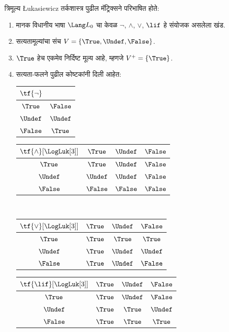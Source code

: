 \begin{defn}\label{mvl:thr:luk:def:lukasiewicz}
त्रिमूल्य \L ukasiewicz तर्कशास्त्र पुढील मॅट्रिक्सने परिभाषित होते:
\begin{enumerate}
  \item मानक विधानीय भाषा $\Lang L_0$ चा केवळ
  $\lnot$, $\land$, $\lor$, $\lif$ हे संयोजक असलेला खंड.
  \item सत्यतामूल्यांचा संच $V = \{\True, \Undef, \False\}$.
  \item $\True$ हेच एकमेव निर्दिष्ट मूल्य आहे, म्हणजे $V^+ = \{\True\}$.
  \item सत्यता-फलने पुढील कोष्टकांनी दिली आहेत:
  \begin{center}
    \begin{tabular}{c|c}
      $\tf{\lnot}$ & \\
      \hline
      $\True$ & $\False$ \\
      $\Undef$ & $\Undef$ \\
      $\False$ & $\True$
    \end{tabular}
    \quad
    \begin{tabular}{c|ccc}
      $\tf{\land}[\LogLuk[3]]$ & $\True$ & $\Undef$ & $\False$ \\
      \hline
      $\True$ & $\True$ & $\Undef$ & $\False$ \\
      $\Undef$ & $\Undef$ & $\Undef$ & $\False$\\
      $\False$ & $\False$ & $\False$ & $\False$
    \end{tabular}
    \\[2ex]
    \begin{tabular}{c|ccc}
      $\tf{\lor}[\LogLuk[3]]$ & $\True$ & $\Undef$ & $\False$ \\
      \hline
      $\True$ & $\True$ & $\True$ & $\True$ \\
      $\Undef$ & $\True$ & $\Undef$ & $\Undef$ \\
      $\False$ & $\True$ & $\Undef$ & $\False$
    \end{tabular}
    \quad
    \begin{tabular}{c|ccc}
      $\tf{\lif}[\LogLuk[3]]$ & $\True$ & $\Undef$ & $\False$ \\
      \hline
      $\True$ & $\True$ & $\Undef$ & $\False$ \\
      $\Undef$ & $\True$ & $\True$ & $\Undef$  \\
      $\False$ & $\True$ & $\True$ & $\True$
    \end{tabular}
  \end{center}
\end{enumerate}
\end{defn}
